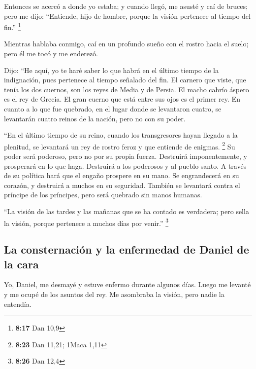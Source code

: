 \begin{paracol}{2}
 Entonces se acercó a donde yo estaba; y cuando llegó, me
asusté y caí de bruces; pero me dijo: ``Entiende, hijo de hombre, porque
la visión pertenece al tiempo del fin.'' \footnote{\textbf{8:17} Dan
  10,9}

 Mientras hablaba conmigo, caí en un profundo sueño con
el rostro hacia el suelo; pero él me tocó y me enderezó.

 Dijo: ``He aquí, yo te haré saber lo que habrá en el
último tiempo de la indignación, pues pertenece al tiempo señalado del
fin.  El carnero que viste, que tenía los dos cuernos,
son los reyes de Media y de Persia.  El macho cabrío
áspero es el rey de Grecia. El gran cuerno que está entre sus ojos es el
primer rey.  En cuanto a lo que fue quebrado, en el lugar
donde se levantaron cuatro, se levantarán cuatro reinos de la nación,
pero no con su poder.

 ``En el último tiempo de su reino, cuando los
transgresores hayan llegado a la plenitud, se levantará un rey de rostro
feroz y que entiende de enigmas. \footnote{\textbf{8:23} Dan 11,21;
  1Maca 1,11}  Su poder será poderoso, pero no por su
propia fuerza. Destruirá imponentemente, y prosperará en lo que haga.
Destruirá a los poderosos y al pueblo santo.  A través de
su política hará que el engaño prospere en su mano. Se engrandecerá en
su corazón, y destruirá a muchos en su seguridad. También se levantará
contra el príncipe de los príncipes, pero será quebrado sin manos
humanas.

 ``La visión de las tardes y las mañanas que se ha
contado es verdadera; pero sella la visión, porque pertenece a muchos
días por venir.'' \footnote{\textbf{8:26} Dan 12,4}

\hypertarget{la-consternaciuxf3n-y-la-enfermedad-de-daniel-de-la-cara}{%
\subsection{La consternación y la enfermedad de Daniel de la
cara}\label{la-consternaciuxf3n-y-la-enfermedad-de-daniel-de-la-cara}}

 Yo, Daniel, me desmayé y estuve enfermo durante algunos
días. Luego me levanté y me ocupé de los asuntos del rey. Me asombraba
la visión, pero nadie la entendía.

\switchcolumn
\begin{otherlanguage}{english}


\end{otherlanguage}
\end{paracol}
